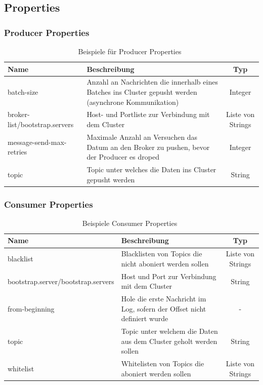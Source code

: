 \begin{frame}[fragile]
\subsection{Properties}
\frametitle{Producer Properties}
\begin{table}
{\footnotesize
\begin{tabularx}{\textwidth}{ |X|X|c| } 
\hline 
Name & Beschreibung & Typ \\ \hline \hline
batch-size & Anzahl an Nachrichten die innerhalb eines Batches ins Cluster gepusht werden (asynchrone Kommunikation) & Integer \\ \hline
broker-list/\newline bootstrap.servers & Host- und Portliste zur Verbindung mit dem Cluster & Liste von Strings \\ \hline
message-send-max-retries & Maximale Anzahl an Versuchen das Datum an den Broker zu pushen, bevor der Producer es droped & Integer \\ \hline
topic & Topic unter welches die Daten ins Cluster gepusht werden & String  \\ 
\hline
\end{tabularx}
}
\caption{Beispiele für Producer Properties~\cite{KafkaPropProducer}}
\label{producer_prop}
\end{table}
\begin{center}
\end{center}
\end{frame}

\begin{frame}[fragile]
\frametitle{Consumer Properties}
\begin{table}
{\footnotesize
\begin{tabularx}{\textwidth}{ |X|X|c| } 
\hline 
Name & Beschreibung & Typ \\ \hline \hline
blacklist & Blacklisten von Topics die nicht aboniert werden sollen & Liste von Strings \\ \hline
bootstrap.server/\newline bootstrap.servers & Host und Port zur Verbindung mit dem Cluster & String \\ \hline
from-beginning & Hole die erste Nachricht im Log, sofern der Offset nicht definiert wurde & - \\ \hline
topic & Topic unter welchem die Daten aus dem Cluster geholt werden sollen & String  \\ \hline
whitelist & Whitelisten von Topics die aboniert werden sollen & Liste von Strings \\ 
\hline
\end{tabularx}
}
\caption{Beispiele Consumer Properties~\cite{KafkaPropConsumer}}
\label{consumer_prop}
\end{table}
\begin{center}
\end{center}
\end{frame}

